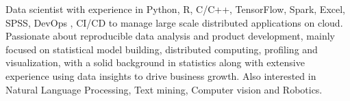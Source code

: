 %
%
%
\par{
Data scientist with experience in Python, R, C/C++, TensorFlow, Spark,  Excel, SPSS, DevOps , CI/CD to manage large scale distributed applications on cloud. Passionate about reproducible data analysis and product development, mainly focused on statistical model building, distributed computing, profiling and visualization, with a solid background in statistics along with extensive experience using data insights to drive business growth. Also interested in Natural Language Processing, Text mining, Computer vision and Robotics. 
}